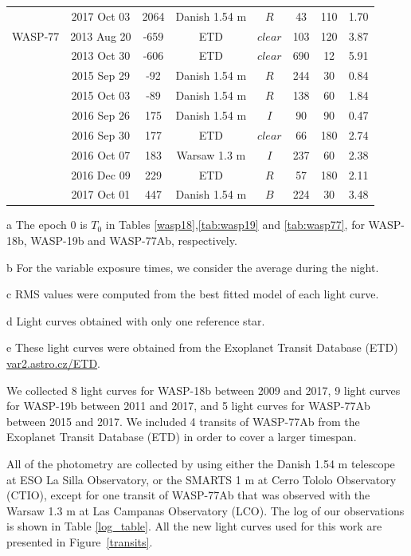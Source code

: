 \begin{table}
\begin{threeparttable}
\begin{tabular}{cccccccc}
     & 2017 Oct 03 & 2064 & Danish 1.54 m & $R$ & 43 & 110 & 1.70\\ 
 WASP-77 & 2013 Aug 20 & -659 & ETD\tnote{e} & $clear$ & 103 & 120 & 3.87  \\
    & 2013 Oct 30 & -606 & ETD\tnote{e} & $clear$ & 690 & 12 & 5.91 \\
    & 2015 Sep 29 & -92 & Danish 1.54 m & $R$ &  244 & 30 &  0.84\\
      & 2015 Oct 03 & -89 & Danish 1.54 m & $R$ &  138 & 60 &  1.84\\
      & 2016 Sep 26 & 175 & Danish 1.54 m & $I$ &  90 & 90 &  0.47\\
      & 2016 Sep 30 & 177 & ETD\tnote{e}& $clear$ & 66 & 180 & 2.74 \\
      & 2016 Oct 07 & 183 & Warsaw 1.3 m & $I$ & 237 & 60 &  2.38 \\ 
      & 2016 Dec 09 & 229 & ETD\tnote{e} & $R$ & 57 & 180 & 2.11 \\ 
      & 2017 Oct 01 & 447 & Danish 1.54 m & $B$ &  224 & 30 &   3.48\\
\hline                  
\end{tabular}
\begin{tablenotes}
	\footnotesize
	\item[a] The epoch 0 is $T_{0}$ in Tables \ref{wasp18},\ref{tab:wasp19} and \ref{tab:wasp77}, for WASP-18b, WASP-19b and WASP-77Ab, respectively.
	\item[b] For the variable exposure times, we consider the average during the night.
	\item[c] RMS values were computed from the best fitted model of each light curve.
	\item[d] Light curves obtained with only one reference star.
	\item[e] These light curves were obtained from the Exoplanet Transit Database (ETD) \url{var2.astro.cz/ETD}.
\end{tablenotes}
\end{threeparttable}
\end{table}

We collected 8 light curves for WASP-18b between 2009 and 2017, 9 light curves for WASP-19b between 2011 and 2017, and 5 light curves for WASP-77Ab between 2015 and 2017. We included 4 transits of WASP-77Ab from the Exoplanet Transit Database (ETD) in order to cover a larger timespan.

All of the photometry are collected by using either the Danish 1.54 m telescope at ESO La Silla Observatory, or the SMARTS 1 m at Cerro Tololo Observatory (CTIO), except for one transit of WASP-77Ab that was observed with the Warsaw 1.3 m at Las Campanas Observatory (LCO). The log of our observations is shown in Table \ref{log_table}. All the new light curves used for this work are presented in Figure~\ref{transits}.

